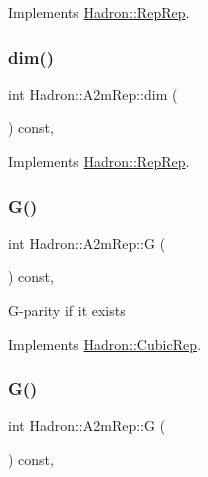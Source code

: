 Implements \mbox{\hyperlink{structHadron_1_1RepRep_a92c8802e5ed7afd7da43ccfd5b7cd92b}{Hadron\+::\+Rep\+Rep}}.

\mbox{\label{structHadron_1_1A2mRep_afa793882b0e3f47c922a65b8a17750a3}} 
\subsubsection{\texorpdfstring{dim()}{dim()}\hspace{0.1cm}{\footnotesize\ttfamily [3/3]}}
{\footnotesize\ttfamily int Hadron\+::\+A2m\+Rep\+::dim (\begin{DoxyParamCaption}{ }\end{DoxyParamCaption}) const\hspace{0.3cm}{\ttfamily [inline]}, {\ttfamily [virtual]}}



Implements \mbox{\hyperlink{structHadron_1_1RepRep_a92c8802e5ed7afd7da43ccfd5b7cd92b}{Hadron\+::\+Rep\+Rep}}.

\mbox{\label{structHadron_1_1A2mRep_a1792c6f3d21c43c796544e2f8113630a}} 
\subsubsection{\texorpdfstring{G()}{G()}\hspace{0.1cm}{\footnotesize\ttfamily [1/2]}}
{\footnotesize\ttfamily int Hadron\+::\+A2m\+Rep\+::G (\begin{DoxyParamCaption}{ }\end{DoxyParamCaption}) const\hspace{0.3cm}{\ttfamily [inline]}, {\ttfamily [virtual]}}

G-\/parity if it exists 

Implements \mbox{\hyperlink{structHadron_1_1CubicRep_a52104e43266d1614c00bbd1c3b395458}{Hadron\+::\+Cubic\+Rep}}.

\mbox{\label{structHadron_1_1A2mRep_a1792c6f3d21c43c796544e2f8113630a}} 
\subsubsection{\texorpdfstring{G()}{G()}\hspace{0.1cm}{\footnotesize\ttfamily [2/2]}}
{\footnotesize\ttfamily int Hadron\+::\+A2m\+Rep\+::G (\begin{DoxyParamCaption}{ }\end{DoxyParamCaption}) const\hspace{0.3cm}{\ttfamily [inline]}, {\ttfamily [virtual]}}

